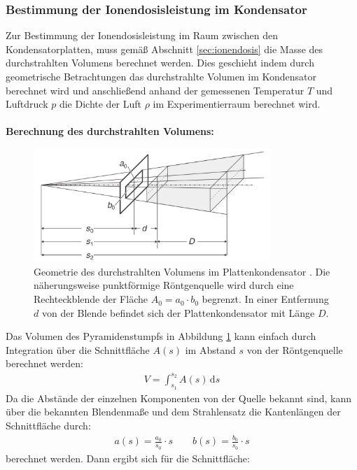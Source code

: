 \documentclass[11pt, a4paper]{article}
\numberwithin{equation}{section}
\begin{document}
\subsubsection{Bestimmung der Ionendosisleistung im Kondensator}
Zur Bestimmung der Ionendosisleistung im Raum zwischen den Kondensatorplatten, muss gemäß Abschnitt \ref{sec:ionendosis} die Masse des durchstrahlten Volumens berechnet werden.
Dies geschieht indem durch geometrische Betrachtungen das durchstrahlte Volumen im Kondensator berechnet wird und anschließend anhand der gemessenen Temperatur $T$ und Luftdruck $p$ die Dichte der Luft $\rho$ im Experimentierraum berechnet wird.\\
\\
\textbf{Berechnung des durchstrahlten Volumens:}\\
\begin{figure}[ht]
	\centering
	\includegraphics[width=0.8\textwidth]{./figures/volumen_kondensator.png}
	\caption{Geometrie des durchstrahlten Volumens im Plattenkondensator \cite{ld_didactic}. Die näherungsweise punktförmige Röntgenquelle wird durch eine Rechteckblende der Fläche $A_0 = a_0 \cdot b_0$ begrenzt. In einer Entfernung $d$ von der Blende befindet sich der Plattenkondensator mit Länge $D$.}
	\label{fig:kondensator_volumen}
\end{figure}
Das Volumen des Pyramidenstumpfs in Abbildung \ref{fig:kondensator_volumen} kann einfach durch Integration über die Schnittfläche $A(s)$ im Abstand $s$ von der Röntgenquelle berechnet werden:
\begin{align}
	V = \int_{s_1}^{s_2} A(s) \, \mathrm{d}s
\end{align}
Da die Abstände der einzelnen Komponenten von der Quelle bekannt sind, kann über die bekannten Blendenmaße und dem Strahlensatz die Kantenlängen der Schnittfläche durch:
\begin{align}
	a(s) = \frac{a_0}{s_0} \cdot s \qquad b(s) = \frac{b_0}{s_0} \cdot s
\end{align}
berechnet werden.
Dann ergibt sich für die Schnittfläche:
\end{document}

